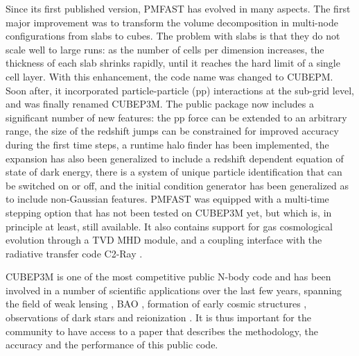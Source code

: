 \documentclass[useAMS,usenatbib]{mn2e}
\begin{document}
Since its first published version, {\small PMFAST} has evolved in many aspects. 
The first major improvement was to transform the volume decomposition in multi-node configurations 
from slabs to cubes. The problem with slabs is that they do not scale well to large runs: 
as the number of cells per dimension increases, the thickness of each slab shrinks rapidly,
until it reaches the hard limit of a single cell layer.  With this enhancement, the code name was changed to {\small CUBEPM}. Soon after, it incorporated particle-particle (pp) interactions at the sub-grid level, 
and was finally renamed {\small CUBEP3M}. The public package now includes a significant number of new features: the pp force
can be extended to an arbitrary range, the size of the redshift jumps can be constrained for improved accuracy during the first time steps,
a runtime halo finder has been implemented, the expansion has also been generalized to include a redshift dependent equation of state of dark energy, there is a system of unique particle identification that can be switched on or off, and the initial condition generator has been generalized as to include non-Gaussian features.
 {\small PMFAST} was equipped with a multi-time stepping option that has not been tested on {\small CUBEP3M} yet, but which is, in principle at least, still available. 
 It also contains support for gas cosmological evolution through a TVD MHD module,
 and a coupling interface with the radiative transfer code C2-Ray \citep{2006NewA...11..374M}. 

{\small CUBEP3M} is one of the most competitive public N-body code and
has been involved in a number of scientific applications over the last few years,
spanning the field of weak lensing \citep{Vafaei10, 2008MNRAS.388.1819L,  2009arXiv0905.0501D, 2010PhRvD..81l3015L, 2010arXiv1012.0444Y, 2012arXiv1202.2332H},  BAO
 \citep{2010arXiv1008.3506Z,  2012MNRAS.419.2949N, 2012MNRAS.423.2288H, 2012arXiv1205.4989H}, 
formation of early cosmic structures \citep{2008arXiv0806.2887I,2010arXiv1005.2502I},
observations of dark stars \citep{2010MNRAS.407L..74Z,2012MNRAS.tmp.2794I} and
reionization \citep{2011arXiv1107.4772I,Fernandez:2011ab,2011MNRAS.413.1353F,2012MNRAS.422..926M,Datta:2011hv,2012arXiv1203.0517F}. 
It is thus important for the community to have access to a paper that describes the methodology, the accuracy and the performance of this public code. 

\end{document}
